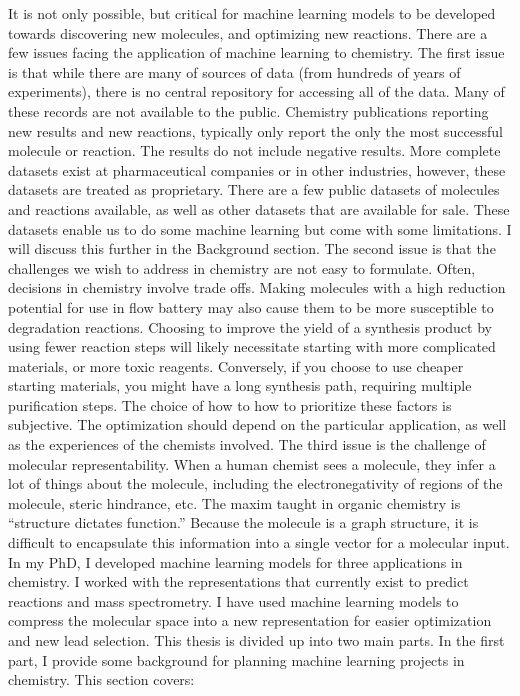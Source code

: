 It is not only possible, but critical for machine learning models to be developed towards discovering new molecules, and optimizing new reactions.
There are a few issues facing the application of machine learning to chemistry. The first issue is that while there are many of sources of data (from hundreds of years of experiments), there is no central repository for accessing all of the data. Many of these records are not available to the public. Chemistry publications reporting new results and new reactions, typically only report the only the most successful molecule or reaction. The results do not include negative results. More complete datasets exist at pharmaceutical companies or in other industries, however, these datasets are treated as  proprietary. There are a few public datasets of molecules and reactions available, as well as other datasets that are available for sale. These datasets enable us to do some machine learning but come with some limitations. I will discuss this further in the Background section.
The second issue is that the challenges we wish to address in chemistry are not easy to formulate. Often, decisions in chemistry involve trade offs. Making molecules with a high reduction potential for use in flow battery may also cause them to be more susceptible to degradation reactions.\cite{} Choosing to improve the yield of a synthesis product by using fewer reaction steps will likely necessitate starting with more complicated materials, or more toxic reagents. Conversely, if you choose to use cheaper starting materials, you might have a long synthesis path, requiring multiple purification steps. The choice of how to how to prioritize these factors is subjective. The optimization should depend on the particular application, as well as the experiences of the chemists involved.
The third issue is the challenge of molecular representability. When a human chemist sees a molecule, they infer a lot of things about the molecule, including the electronegativity of regions of the molecule, steric hindrance, etc. The maxim taught in organic chemistry is “structure dictates function.” Because the molecule is a graph structure, it is difficult to encapsulate this information into a single vector for a molecular input.
In my PhD, I developed machine learning models for three applications in chemistry. I worked with the representations that currently exist to predict reactions and mass spectrometry. I have used machine learning models to compress the molecular space into a new representation for easier optimization and new lead selection.
This thesis is divided up into two main parts. In the first part, I provide some background for planning machine learning projects in chemistry. This section covers:
